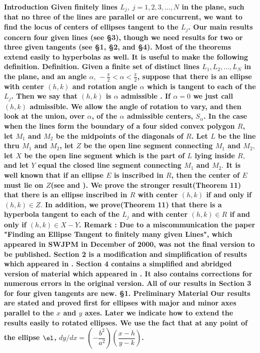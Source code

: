 \bf Introduction \rm \linebreak
	Given finitely lines $L_{j},\;j=1,2,3, ...,N$ in the plane, such that no three of the lines are parallel or are concurrent, we want to find the locus of centers of ellipses tangent to the $L_j$. Our main results concern four given lines (see \S 3), though we need results for two or three given tangents (see \S 1, \S 2, and \S 4). Most of the theorems extend easily to hyperbolas as well. It is useful to make the following definition. \nl \nl
\bf Definition. \rm Given a finite set of distinct lines $L_1,L_2,...,L_N$ in the plane, and an angle $\alpha ,\, -\frac{\pi }{2}<\alpha <\frac{\pi }{2}$, suppose that there is an ellipse with center $(h,k)$ and rotation angle $\alpha $ which is tangent to each of the $L_j$. Then we say that $(h,k)$ is $\alpha $ \bf admissible \rm. If $\alpha =0$ we just call $(h,k)$ admissible. 
	We allow the angle of rotation to \bf vary\rm, and then look at the union, over $\alpha $, of the $\alpha $ admissible centers, $S_{\alpha }$. In the case when the lines form the boundary of a four sided convex polygon $R$, let $M_1$ and $M_2$ be the midpoints of the diagonals of $R$. Let $L$ be the line thru $M_1$ and $M_2$, let $Z$ be the open line segment connecting $M_1$ and $M_2,$ let $X$ be the open line segment which is the part of $L$ lying inside $R,$ and let $Y$ equal the \bf closed \rm line segment connecting $M_1$ and $M_2.$ It is well known that if an ellipse $E$ is \bf inscribed \rm in $R$, then the center of $E$ must lie on $Z$(see \cite{1} and \cite{2}). We prove the stronger result(Theorem 11) that there is an ellipse inscribed in $R$ with center $(h,k)$ if and only if $(h,k)\in Z.$ In addition, we prove(Theorem 11) that there is a hyperbola tangent to each of the $L_{j}$ and with center $(h,k)\in R$ if and only if $(h,k)\in X-Y$. \nl	
\bf Remark \rm: Due to a miscommunication the paper "Finding an Ellipse Tangent to finitely many given Lines"\cite{3}, which appeared in SWJPM in December of 2000, was not the final version to be published. Section 2 is a modification and simplification of results which appeared in \cite{3}. Section 4 contains a simplified and abridged version of material which appeared in \cite{3}. It also contains corrections for numerous errors in the original version. All of our results in Section 3 for four given tangents are new. \nl \nl
\bf \S 1. Preliminary Material \rm \nl
	Our results are stated and proved first for ellipses with major and minor axes parallel to the $x$ and $y$ axes. Later we indicate how to extend the results easily to rotated ellipses. We use the fact that at any point of the ellipse $\el$, $dy/dx=\left( -\dfrac{b^{2}}{a^{2}}\right) \left( \dfrac{x-h}{y-k}\right)$. \nl 
